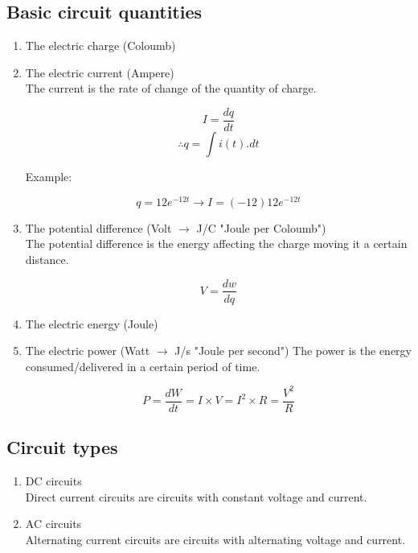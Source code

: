 \documentclass[a4paper]{book}
\begin{document}
\subsection{Basic circuit quantities}

\begin{enumerate}

  \item The electric charge (Coloumb)

  \item The electric current (Ampere)\\
    The current is the rate of change of the quantity of charge.

    \[I = \frac{dq}{dt}\]
    \[\therefore q = \int i(t).dt\]

    Example:

    \[q = 12e^{-12t} \to I = (-12)12e^{-12t}\]

  \item The potential difference (Volt $\to$ J/C "Joule per Coloumb")\\
    The potential difference is the energy affecting the charge moving it a certain distance.

    \[V = \frac{dw}{dq}\]

  \item The electric energy (Joule)

  \item The electric power (Watt $\to$ J/s "Joule per second")
    The power is the energy consumed/delivered in a certain period of time.

    \[P = \frac{dW}{dt} = I \times V = I^{2} \times R = \frac{V^2}{R}\]

\end{enumerate}

\subsection{Circuit types}

\begin{enumerate}


  \item DC circuits\\
    Direct current circuits are circuits with constant voltage and current.

  \item AC circuits\\
    Alternating current circuits are circuits with alternating voltage and current.

\end{enumerate}
\end{document}

